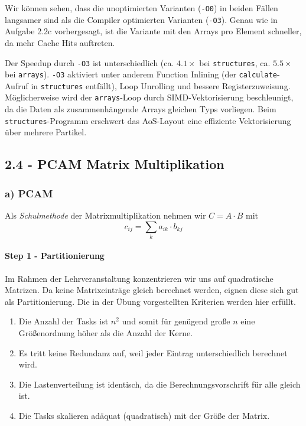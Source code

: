 Wir können sehen, dass die unoptimierten Varianten (\texttt{-O0}) in beiden Fällen langsamer sind als die Compiler optimierten Varianten (\texttt{-O3}). Genau wie in Aufgabe 2.2c vorhergesagt, ist die Variante mit den Arrays pro Element schneller, da mehr Cache Hits auftreten.

Der Speedup durch \texttt{-O3} ist unterschiedlich (ca. $4.1\times$ bei \texttt{structures}, ca. $5.5\times$ bei \texttt{arrays}). \texttt{-O3} aktiviert unter anderem Function Inlining (der \texttt{calculate}-Aufruf in \texttt{structures} entfällt), Loop Unrolling und bessere Registerzuweisung. Möglicherweise wird der \texttt{arrays}-Loop durch SIMD-Vektorisierung beschleunigt, da die Daten als zusammenhängende Arrays gleichen Typs vorliegen. Beim \texttt{structures}-Programm erschwert das AoS-Layout eine effiziente Vektorisierung über mehrere Partikel.

\subsection*{2.4 - PCAM Matrix Multiplikation}

\subsubsection*{a) PCAM}

Als \textit{Schulmethode} der Matrixmultiplikation nehmen wir $C = A \cdot B$ mit 
$$
c_{ij} = \sum_k a_{ik} \cdot b_{kj}
$$

\paragraph{Step 1 - Partitionierung} Im Rahmen der Lehrveranstaltung konzentrieren wir uns auf quadratische Matrizen. Da keine Matrixeinträge gleich berechnet werden, eignen diese sich gut als Partitionierung. Die in der Übung vorgestellten Kriterien werden hier erfüllt.
\begin{enumerate}
  \item Die Anzahl der Tasks ist $n^2$ und somit für genügend große $n$ eine Größenordnung höher als die Anzahl der Kerne.
  \item Es tritt keine Redundanz auf, weil jeder Eintrag unterschiedlich berechnet wird.
  \item Die Lastenverteilung ist identisch, da die Berechnungsvorschrift für alle gleich ist.
  \item Die Tasks skalieren adäquat (quadratisch) mit der Größe der Matrix.
\end{enumerate}

